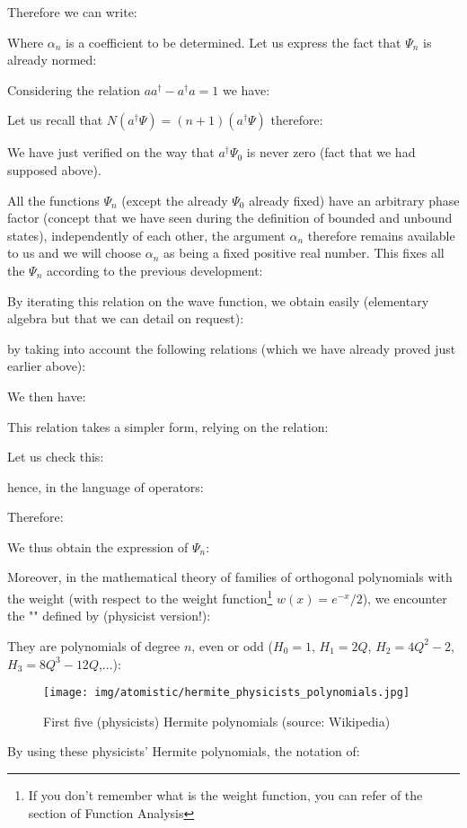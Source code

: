 	Therefore we can write:
	
	Where $\alpha_n$ is a coefficient to be determined. Let us express the fact that $\Psi_n$ is already normed:
	
	Considering the relation $aa^\dagger-a^\dagger a=1$ we have:
	
	Let us recall that $N(a^\dagger\Psi)=(n+1)(a^\dagger\Psi)$ therefore:
	
	We have just verified on the way that $a^\dagger\Psi_0$ is never zero (fact that we had supposed above).

	All the functions $\Psi_n$ (except the already $\Psi_0$ already fixed) have an arbitrary phase factor (concept that we have seen during the definition of bounded and unbound states), independently of each other, the argument $\alpha_n$ therefore remains available to us and we will choose $\alpha_n$ as being a fixed positive real number. This fixes all the $\Psi_n$ according to the previous development:
	
	By iterating this relation on the wave function, we obtain easily (elementary algebra but that we can detail on request):
	
	by taking into account the following relations (which we have already proved just earlier above):
	
	We then have:
	
	This relation takes a simpler form, relying on the relation:
	
	Let us check this:
	
	hence, in the language of operators:
	
	Therefore:
	
	We thus obtain the expression of $\Psi_n$:
	
	Moreover, in the mathematical theory of families of orthogonal polynomials with the weight (with respect to the weight function\footnote{If you don't remember what is the weight function, you can refer of the section of Function Analysis} $w(x)=e^{-x}/2$), we encounter the "" defined by (physicist version!):
	
	They are polynomials of degree $n$, even or odd ($H_0=1$, $H_1=2Q$, $H_2=4Q^2-2$, $H_3=8Q^3-12Q$,...):
	\begin{figure}[H]
		\centering
		\texttt{[image: img/atomistic/hermite\_physicists\_polynomials.jpg]}	
		\caption[First five (physicists) Hermite polynomials]{First five (physicists) Hermite polynomials (source: Wikipedia)}
	\end{figure}
	By using these physicists' Hermite polynomials, the notation of:
	

